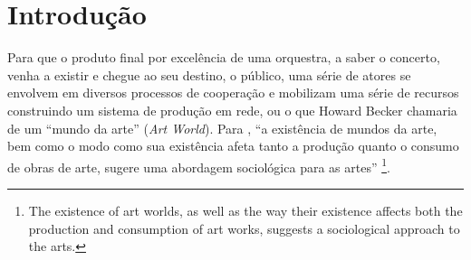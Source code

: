 \documentclass[a4paper, 12pt, openright, oneside, german, french, english, brazil]{abntex2}
\begin{document}
	\listoffigures
	\listoftables
	\newpage
	\tableofcontents
	\textual

	\chapter*[Introdução]{Introdução}

	Para que o produto final por excelência de uma orquestra, a saber o concerto, venha a existir e chegue ao seu destino, o público, uma série de atores se envolvem em diversos processos de cooperação e mobilizam uma série de recursos construindo um sistema de produção em rede, ou o que Howard Becker chamaria de um ``mundo da arte'' (\textit{Art World}). Para , ``a existência de mundos da arte, bem como o modo como sua existência afeta tanto a produção quanto o consumo de obras de arte, sugere uma abordagem sociológica para as artes'' \footnote{The existence of art worlds, as well as the way their existence affects both the production and consumption of art works, suggests a sociological approach to the arts.}.



\end{document}
